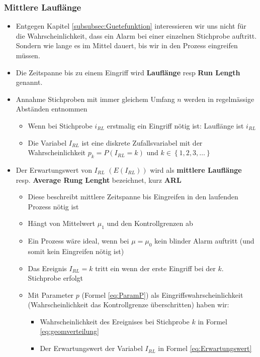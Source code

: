 \subsubsection{Mittlere Lauflänge}
\label{subsubsec:MittlereLauflaenge}
\begin{itemize}
	\item Entgegen Kapitel \ref{subsubsec:Guetefunktion} interessieren wir uns nicht für die Wahrscheinlichkeit, dass ein Alarm bei einer einzelnen Stichprobe auftritt. Sondern wie lange es im Mittel dauert, bis wir in den Prozess eingreifen müssen. 
	\item Die Zeitspanne bis zu einem Eingriff wird \textbf{Lauflänge} resp \textbf{Run Length} genannt.
	\item Annahme Stichproben mit immer gleichem Umfang $n$ werden in regelmässige Abständen entnommen
	\begin{itemize}
		\item Wenn bei Stichprobe $i_{RL}$ erstmalig ein Eingriff nötig ist: Lauflänge ist $i_{RL}$
		\item Die Variabel $I_{RL}$ ist eine diskrete Zufallsvariabel mit der Wahrscheinlichkeit $p_k=P(I_{RL}=k)$ und $k\in\left\lbrace1,2,3,\ldots\right\rbrace$
	\end{itemize}
	\item Der Erwartungswert von $I_{RL}$ $\left( E\left(I_{RL}\right)\right)$ wird als \textbf{mittlere Lauflänge} resp. \textbf{Average Rung Lenght} bezeichnet, kurz \textbf{ARL}
	\begin{itemize}
		\item Diese beschreibt mittlere Zeitspanne bis Eingreifen in den laufenden Prozess nötig ist
		\item Hängt von Mittelwert $\mu_1$ und den Kontrollgrenzen ab
		\item Ein Prozess wäre ideal, wenn bei $\mu=\mu_0$ kein blinder Alarm auftritt (und somit kein Eingreifen nötig ist)
		\item Das Ereignis $I_{RL}=k$  tritt ein wenn der erste Eingriff bei der $k.$ Stichprobe erfolgt
		\item Mit Parameter $p$ (Formel \ref{eq:ParamP}) als Eingriffswahrscheinlichkeit (Wahrscheinlichkeit das Kontrollgrenze überschritten) haben wir:
		\begin{itemize}
			\item Wahrscheinlichkeit des Ereignises bei Stichprobe $k$ in Formel \ref{eq:geomverteilung}
			\item Der Erwartungswert der Variabel $I_{RL}$ in Formel \ref{eq:Erwartungswert}

\end{itemize}
\end{itemize}
\end{itemize}
